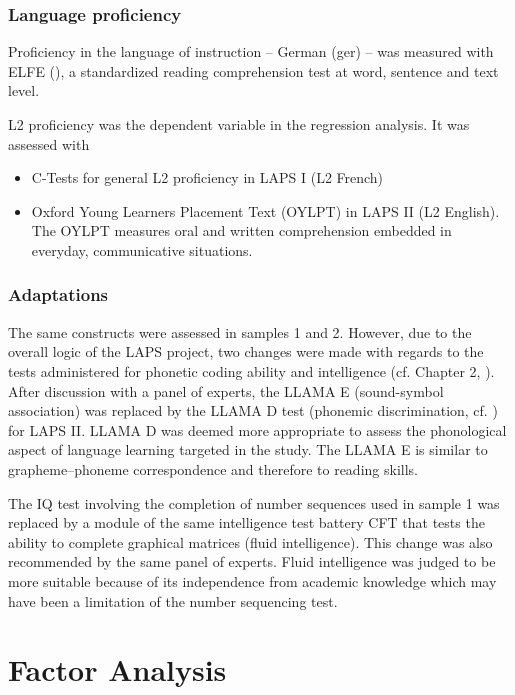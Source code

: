 \documentclass[output=paper]{langsci/langscibook}
\begin{document}
\subsubsection{Language proficiency}

Proficiency in the language of instruction – German (ger) – was measured with ELFE (\citealt{LenhardSchneider2006}), a standardized reading comprehension test at word, sentence and text level.

L2 proficiency was the dependent variable in the regression analysis. It was assessed with 

\begin{itemize}
\item C-Tests for general L2 proficiency in LAPS I (L2 French)
\item Oxford Young Learners Placement Text (OYLPT) \citep{Testing2013} in LAPS II (L2 English). The OYLPT measures oral and written comprehension embedded in everyday, communicative situations.
\end{itemize}

\subsubsection{Adaptations}\label{sec:03:2.2.5}

The same constructs were assessed in samples 1 and 2. However, due to the overall logic of the LAPS project, two changes were made with regards to the tests administered for phonetic coding ability and intelligence (cf. Chapter 2, ). After discussion with a panel of experts, the LLAMA E (sound-symbol association) was replaced by the LLAMA D test (phonemic discrimination, cf. \citealt{MearaEtAl2001}) for LAPS II. LLAMA D was deemed more appropriate to assess the phonological aspect of language learning targeted in the study. The LLAMA E is similar to grapheme–phoneme correspondence and therefore to reading skills.

The IQ test involving the completion of number sequences used in sample 1 was replaced by a module of the same intelligence test battery CFT \citep{Weiss2006} that tests the ability to complete graphical matrices (fluid intelligence). This change was also recommended by the same panel of experts. Fluid intelligence was judged to be more suitable because of its independence from academic knowledge which may have been a limitation of the number sequencing test. 

\section{Factor Analysis}
\end{document}
